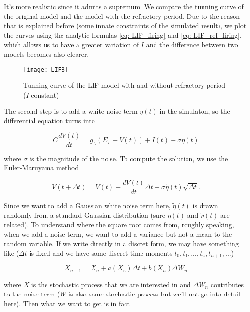 \noindent
It's more realistic since it admits a supremum. We compare the tunning curve
of the original model and the model with the refractory period. Due to the
reason that is explained before (some innate constraints of the simulated
result), we plot the curves using the analytic formulas 
\eqref{eq: LIF_firing} and \eqref{eq: LIF_ref_firing}, which allows us to
have a greater variation of $I$ and the difference between two models becomes
also clearer.

\vspace{-1em}
\begin{figure}[H]
  \centering
  \texttt{[image: LIF8]}
  \caption{Tunning curve of the LIF model with and 
           without refractory period ($I$ constant)}
\end{figure}

\newpage
The second step is to add a white noise term $\eta(t)$ in the simulaton, so
the differential equation turns into

\begin{equation}
  C\frac{dV(t)}{dt} = g_L(E_L-V(t)) + I(t) + \sigma\eta(t)
\end{equation}

\noindent
where $\sigma$ is the magnitude of the noise. To compute the solution, we use
the Euler-Maruyama method

\begin{equation}
  \label{eq: Euler-Maruyama}
  V(t + \Delta t) = V(t) + \frac{dV(t)}{dt}\Delta t 
  + \sigma\tilde{\eta}(t)\sqrt{\Delta t}.
\end{equation}

\noindent
Since we want to add a Gaussian white noise term here, $\tilde{\eta}(t)$ is
drawn randomly from a standard Gaussian distribution (sure $\eta(t)$ and
$\tilde{\eta}(t)$ are related). To understand where the square root comes 
from, roughly speaking, when we add a noise term, we want to add a variance
but not a mean to the random variable. If we write directly in a discret form,
we may have something like
($\Delta t$ is fixed and we have some discret time moments 
$t_0, t_1, ..., t_n, t_{n+1}, ...$)

\begin{equation}
  X_{n+1} = X_n + a(X_n)\Delta t + b(X_n) \Delta W_n
\end{equation}

\noindent
where $X$ is the stochastic process that we are interested in and 
$\Delta W_n$ contributes to the noise term ($W$ is also some stochastic 
process but we'll not go into detail here). Then what we want to get is 
in fact

